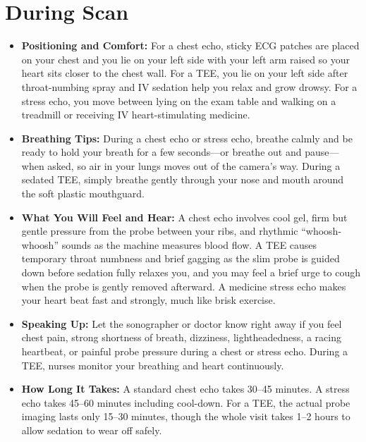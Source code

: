 \section{During Scan}
\begin{itemize}
\item \textbf{Positioning and Comfort:} For a chest echo, sticky ECG patches are placed on your chest and you lie on your left side with your left arm raised so your heart sits closer to the chest wall. For a TEE, you lie on your left side after throat-numbing spray and IV sedation help you relax and grow drowsy. For a stress echo, you move between lying on the exam table and walking on a treadmill or receiving IV heart-stimulating medicine.
\item \textbf{Breathing Tips:} During a chest echo or stress echo, breathe calmly and be ready to hold your breath for a few seconds---or breathe out and pause---when asked, so air in your lungs moves out of the camera's way. During a sedated TEE, simply breathe gently through your nose and mouth around the soft plastic mouthguard.
\item \textbf{What You Will Feel and Hear:} A chest echo involves cool gel, firm but gentle pressure from the probe between your ribs, and rhythmic ``whoosh-whoosh'' sounds as the machine measures blood flow. A TEE causes temporary throat numbness and brief gagging as the slim probe is guided down before sedation fully relaxes you, and you may feel a brief urge to cough when the probe is gently removed afterward. A medicine stress echo makes your heart beat fast and strongly, much like brisk exercise.
\item \textbf{Speaking Up:} Let the sonographer or doctor know right away if you feel chest pain, strong shortness of breath, dizziness, lightheadedness, a racing heartbeat, or painful probe pressure during a chest or stress echo. During a TEE, nurses monitor your breathing and heart continuously.
\item \textbf{How Long It Takes:} A standard chest echo takes 30--45 minutes. A stress echo takes 45--60 minutes including cool-down. For a TEE, the actual probe imaging lasts only 15--30 minutes, though the whole visit takes 1--2 hours to allow sedation to wear off safely.
\end{itemize}

